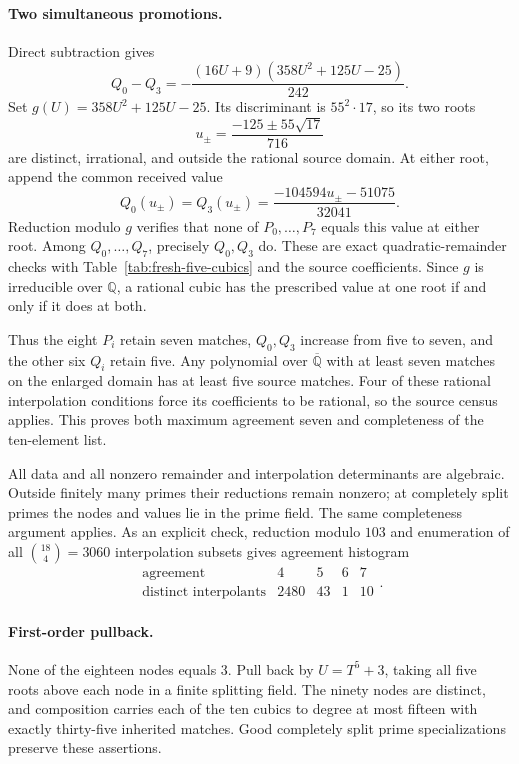 \paragraph{Two simultaneous promotions.}
Direct subtraction gives
\[
Q_0-Q_3=-\frac{(16U+9)(358U^2+125U-25)}{242}.
\]
Set $g(U)=358U^2+125U-25$. Its discriminant is $55^2\cdot17$, so its two roots
\[
u_\pm=\frac{-125\pm55\sqrt{17}}{716}
\]
are distinct, irrational, and outside the rational source domain. At either root, append the common received value
\[
Q_0(u_\pm)=Q_3(u_\pm)
=\frac{-104594u_\pm-51075}{32041}.
\]
Reduction modulo $g$ verifies that none of $P_0,\ldots,P_7$ equals this value at either root. Among $Q_0,\ldots,Q_7$, precisely $Q_0,Q_3$ do. These are exact quadratic-remainder checks with Table~\ref{tab:fresh-five-cubics} and the source coefficients. Since $g$ is irreducible over $\mathbb Q$, a rational cubic has the prescribed value at one root if and only if it does at both.

Thus the eight $P_i$ retain seven matches, $Q_0,Q_3$ increase from five to seven, and the other six $Q_i$ retain five. Any polynomial over $\overline{\mathbb Q}$ with at least seven matches on the enlarged domain has at least five source matches. Four of these rational interpolation conditions force its coefficients to be rational, so the source census applies. This proves both maximum agreement seven and completeness of the ten-element list.

All data and all nonzero remainder and interpolation determinants are algebraic. Outside finitely many primes their reductions remain nonzero; at completely split primes the nodes and values lie in the prime field. The same completeness argument applies. As an explicit check, reduction modulo $103$ and enumeration of all $\binom{18}{4}=3060$ interpolation subsets gives agreement histogram
\[
\begin{array}{c|rrrr}\text{agreement}&4&5&6&7\\\hline
\text{distinct interpolants}&2480&43&1&10\end{array}.
\]

\paragraph{First-order pullback.}
None of the eighteen nodes equals $3$. Pull back by $U=T^5+3$, taking all five roots above each node in a finite splitting field. The ninety nodes are distinct, and composition carries each of the ten cubics to degree at most fifteen with exactly thirty-five inherited matches. Good completely split prime specializations preserve these assertions.

